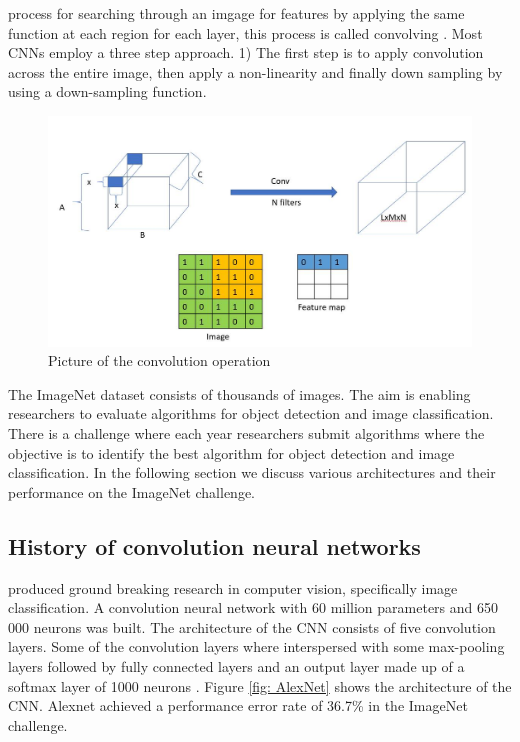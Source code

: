 \documentclass[a4paper,11pt]{article}
\begin{document}
process for searching through an imgage for features by applying the same function at each region for each layer, this process is called convolving \citep{John}. Most CNNs employ a three step approach. 1) The first step is to apply convolution across the entire image, then apply a non-linearity and finally down sampling  by using a down-sampling function. 

\begin{figure}[!htbp]
\includegraphics[scale=0.5]{ConvolutionOperation.jpg} 
\caption{Picture of the convolution operation}
\label{fig: convOp}
\end{figure}
The ImageNet dataset consists of thousands of images. The aim is enabling researchers to evaluate algorithms for object detection and image classification. There is a challenge where each year researchers submit algorithms where the objective is to identify the best algorithm for object detection and image classification. In the following section we discuss various architectures and their performance on the ImageNet challenge. 

\subsection{History of convolution neural networks}
\cite{AlexNet} produced ground breaking research in computer vision, specifically image classification. A convolution neural network with 60 million parameters and 650 000 neurons was built. The architecture of the CNN consists of five convolution layers. Some of the convolution layers where interspersed with some max-pooling layers followed by fully connected layers and an output layer made up of a softmax layer of 1000 neurons \citep{AlexNet}. Figure \ref{fig: AlexNet} shows the architecture of the CNN. Alexnet achieved a performance error rate of 36.7\% in the ImageNet challenge. 
\end{document}
